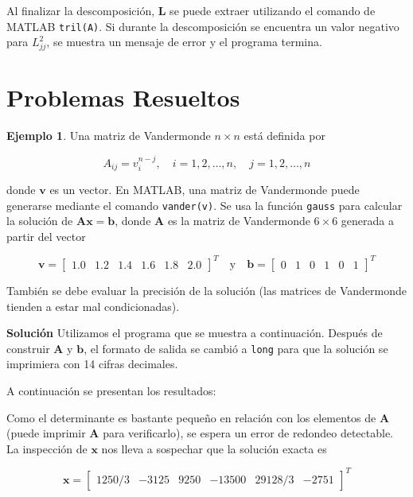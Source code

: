 \documentclass[12pt,letterpaper]{article}
\theoremstyle{definition}
\newtheorem{ejemplo}{Ejemplo}[section]
\theoremstyle{plain}
\theoremstyle{remark}
\begin{document}


Al finalizar la descomposición, $\mathbf{L}$ se puede extraer utilizando el comando de MATLAB \texttt{tril(A)}. Si durante la descomposición se encuentra un valor negativo para $L_{jj}^2$, se muestra un mensaje de error y el programa termina.

\section{Problemas Resueltos}

\begin{ejemplo}
Una matriz de Vandermonde $n \times n$ está definida por

\[
A_{ij} = v_i^{n-j}, \quad i = 1, 2, \ldots, n, \quad j = 1, 2, \ldots, n
\]

donde $\mathbf{v}$ es un vector. En \textsc{MATLAB}, una matriz de Vandermonde puede generarse mediante el comando \texttt{vander(v)}. Se usa la función \texttt{gauss} para calcular la solución de $\mathbf{Ax} = \mathbf{b}$, donde $\mathbf{A}$ es la matriz de Vandermonde $6 \times 6$ generada a partir del vector

\[
\mathbf{v} =
\begin{bmatrix}
1.0 & 1.2 & 1.4 & 1.6 & 1.8 & 2.0
\end{bmatrix}^T
\quad \text{y} \quad \mathbf{b} =
\begin{bmatrix}
0 & 1 & 0 & 1 & 0 & 1
\end{bmatrix}^T
\]

También se debe evaluar la precisión de la solución (las matrices de Vandermonde tienden a estar mal condicionadas).
\end{ejemplo}

\textbf{Solución} \quad Utilizamos el programa que se muestra a continuación. Después de construir $\mathbf{A}$ y $\mathbf{b}$, el formato de salida se cambió a \texttt{long} para que la solución se imprimiera con 14 cifras decimales. 


A continuación se presentan los resultados:


Como el determinante es bastante pequeño en relación con los elementos de $\mathbf{A}$ (puede imprimir $\mathbf{A}$ para verificarlo), se espera un error de redondeo detectable. La inspección de $\mathbf{x}$ nos lleva a sospechar que la solución exacta es

\[
\mathbf{x} =
\begin{bmatrix}
1250/3 & -3125 & 9250 & -13500 & 29128/3 & -2751
\end{bmatrix}^T
\]
\end{document}
